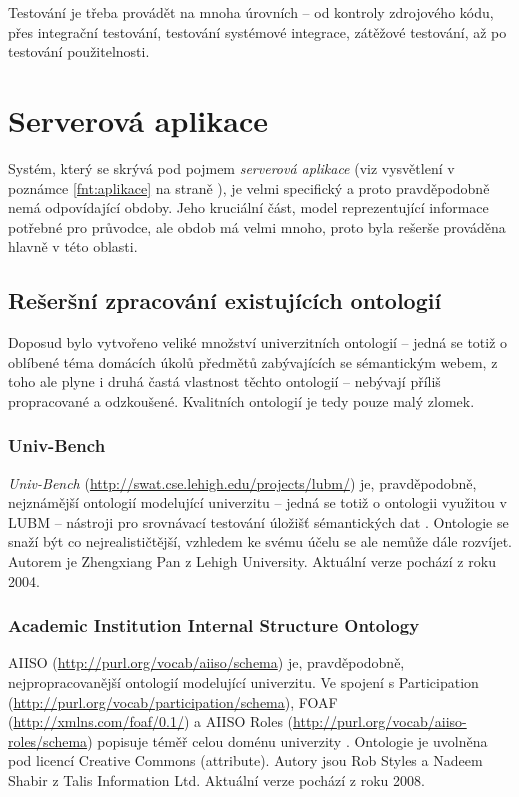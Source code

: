 Testování je třeba provádět na mnoha úrovních -- od kontroly zdrojového kódu, přes integrační testování, testování systémové integrace, zátěžové testování, až po testování použitelnosti.


\section{Serverová aplikace}
Systém, který se skrývá pod pojmem \textit{serverová aplikace} (viz vysvětlení v poznámce \ref{fnt:aplikace} na straně \pageref{fnt:aplikace}), je velmi specifický a proto pravděpodobně nemá odpovídající obdoby. Jeho kruciální část, model reprezentující informace potřebné pro průvodce, ale obdob má velmi mnoho, proto byla rešerše prováděna hlavně v této oblasti.

\subsection{Rešeršní zpracování existujících ontologií}
Doposud bylo vytvořeno veliké množství univerzitních ontologií -- jedná se totiž o oblíbené téma domácích úkolů předmětů zabývajících se sémantickým webem, z toho ale plyne i druhá častá vlastnost těchto ontologií -- nebývají příliš propracované a odzkoušené. Kvalitních ontologií je tedy pouze malý zlomek.

\subsubsection{Univ-Bench}
\emph{Univ-Bench} (\url{http://swat.cse.lehigh.edu/projects/lubm/}) je, pravděpodobně, nejznámější ontologií modelující univerzitu -- jedná se totiž o ontologii využitou v \gls{LUBM} -- nástroji pro srovnávací testování úložišť sémantických dat \cite{Lubm}. Ontologie se snaží být co nejrealističtější, vzhledem ke svému účelu se ale nemůže dále rozvíjet. Autorem je Zhengxiang Pan z Lehigh University. Aktuální verze pochází z roku 2004.

\subsubsection{Academic Institution Internal Structure Ontology}
\Gls{AIISO} (\url{http://purl.org/vocab/aiiso/schema}) je, pravděpodobně, nejpropracovanější ontologií modelující univerzitu. Ve spojení s Participation (\url{http://purl.org/vocab/participation/schema}), \gls{FOAF} (\url{http://xmlns.com/foaf/0.1/}) a \gls{AIISO} Roles (\url{http://purl.org/vocab/aiiso-roles/schema}) popisuje téměř celou doménu univerzity \cite{Aiiso}. Ontologie je uvolněna pod licencí Creative Commons (attribute). Autory jsou Rob Styles a Nadeem Shabir z Talis Information Ltd. Aktuální verze pochází z roku 2008.

